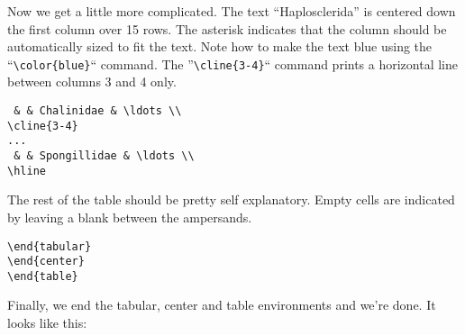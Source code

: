 \normalsize\doublespacing
Now we get a little more complicated.  The text ``Haplosclerida'' is centered down the first column over 15 rows.  The asterisk indicates that the column should be automatically sized to fit the text.  Note how to make the text blue using the ``\small\verb$\color{blue}$\normalsize`` command.  The ''\small\verb$\cline{3-4}$\normalsize`` command prints a horizontal line between columns 3 and 4 only.

\small\singlespacing
\begin{verbatim}
 & & Chalinidae & \ldots \\
\cline{3-4}
...
 & & Spongillidae & \ldots \\
\hline
\end{verbatim}

\normalsize\doublespacing
The rest of the table should be pretty self explanatory.  Empty cells are indicated by leaving a blank between the ampersands.

\small\singlespacing
\begin{verbatim}
\end{tabular}
\end{center}
\end{table}
\end{verbatim}

\normalsize\doublespacing
Finally, we end the tabular, center and table environments and we're done.  It looks like this:

